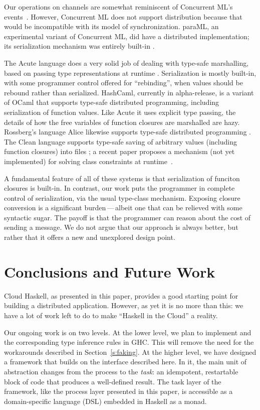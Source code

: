 \documentclass{sigplanconf}
\begin{document}
Our operations on channels are somewhat reminiscent of Concurrent ML's events~\cite{reppy:book}.
However, Concurrent ML does not support distribution because that would be incompatible with its
model of synchronization.  paraML, an experimental variant of Concurrent ML, did have
a distributed implementation; its serialization mechanism was entirely built-in \cite{bailey:paraml}.

The Acute language does a very solid job of dealing with type-safe
marshalling, based on passing type representations at runtime
\cite{acute:jfp}.  Serialization is mostly built-in, with some
programmer control offered for ``rebinding'', when values should be
rebound rather than serialized.  HashCaml, currently in alpha-release, is a
variant of OCaml that supports type-safe distributed
programming, including serialization of function values.  Like Acute
it uses explicit type passing, the details of how the free variables
of function closures are marshalled are hazy.  Rossberg's language
Alice likewise supports type-safe distributed programming
\cite{rossberg:alice}.  
The Clean language supports type-safe saving of arbitrary values (including
function closures) into files \cite{clean:dynamic-io}; a recent
paper proposes a mechanism (not yet implemented) for  solving  class constraints at runtime~\cite[\S4.2]{clean:wgp10}.

A fundamental feature of all of these systems is that serialization of funciton closures
is built-in.  In contrast, our work puts the programmer in
complete control of serialization, via the usual type-class mechanism.
Exposing closure conversion is a significant burden\,---\,albeit one that can be
relieved with some syntactic sugar.  The payoff is that the 
programmer can reason about the cost of sending a message.
We do not argue that our approach is always better, but rather that it offers
a new and unexplored design point.

\section{Conclusions and Future Work}
\label{s:futureWork}
Cloud Haskell, as presented in this paper, provides a good starting point for building a distributed application.  
However, as yet it is no more than this: we have a lot of work left to do to make ``Haskell in the Cloud'' a reality.

Our ongoing work is on two levels.
At the lower level, we plan to implement  and the corresponding type inference rules in GHC.  This will remove the need for the workarounds described in Section~\ref{s:faking}.
At the higher level, we have designed a framework that builds on the interface described here.
In it, the main unit of abstraction changes from the process to the \emph{task}: an idempotent, restartable block of code that produces a well-defined result. The task layer of the framework, like the process layer presented in this paper, is accessible as a domain-specific language (DSL) embedded in Haskell as a monad.
\end{document}
